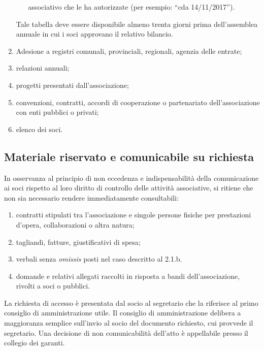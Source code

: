 \begin{enumerate}
\begin{itemize}
                associativo che le ha autorizzate (per esempio: ``cda
                14/11/2017'').
        \end{itemize}
        Tale tabella deve essere disponibile almeno trenta giorni prima
        dell'assemblea annuale in cui i soci approvano il relativo bilancio.
    \item
        Adesione a registri comunali, provinciali, regionali, agenzia delle
        entrate;
    \item
        relazioni annuali;
    \item
        progetti presentati dall'associazione;
    \item
        convenzioni, contratti, accordi di cooperazione o partenariato
        dell'associazione con enti pubblici o privati;
    \item
        elenco dei soci.
\end{enumerate}

\subsection{Materiale riservato e comunicabile su
richiesta}\label{materiale-riservato-e-comunicabile-su-richiesta}

In osservanza al principio di non eccedenza e indispensabilità della
comunicazione ai soci rispetto al loro diritto di controllo delle
attività associative, si ritiene che non sia necessario rendere
immediatamente consultabili:

\begin{enumerate}
    \item
        contratti stipulati tra l'associazione e singole persone fisiche per
        prestazioni d'opera, collaborazioni o altra natura;
    \item
        tagliandi, fatture, giustificativi di spesa;
    \item
        verbali senza \emph{omissis} posti nel caso descritto al 2.1.b.
    \item
        domande e relativi allegati raccolti in risposta a bandi
        dell'associazione, rivolti a soci o pubblici.
\end{enumerate}

La richiesta di accesso è presentata dal socio al segretario che la
riferisce al primo consiglio di amministrazione utile. Il consiglio di
amministrazione delibera a maggioranza semplice sull'invio al socio del
documento richiesto, cui provvede il segretario.
Una decisione di non comunicabilità dell'atto è appellabile presso il
collegio dei garanti.

